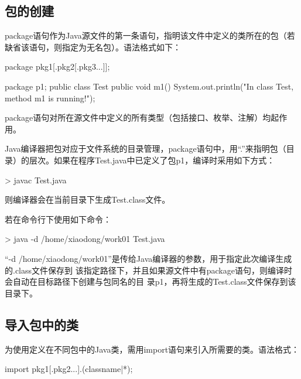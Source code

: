 \subsection{包的创建}

package语句作为Java源文件的第一条语句，指明该文件中定义的类所在的包（若缺省该语句，则指定为无名包）。语法格式如下：

\begin{javaCode}
  package pkg1[.pkg2[.pkg3...]];
\end{javaCode}


\begin{javaCode}
  package p1;
  public class Test {
    public void m1() {
      System.out.println("In class Test, method m1 is running!");
    }
  }
\end{javaCode}

package语句对所在源文件中定义的所有类型（包括接口、枚举、注解）均起作用。

Java编译器把包对应于文件系统的目录管理，package语句中，用“.”来指明包（目录）的层次。如果在程序Test.java中已定义了包p1，编译时采用如下方式：

\begin{shCode}
  > javac Test.java
\end{shCode}

则编译器会在当前目录下生成Test.class文件。

若在命令行下使用如下命令：

\begin{shCode}
  > java -d /home/xiaodong/work01 Test.java
\end{shCode}

“-d /home/xiaodong/work01”是传给Java编译器的参数，用于指定此次编译生成的.class文件保存到
该指定路径下，并且如果源文件中有package语句，则编译时会自动在目标路径下创建与包同名的目
录p1，再将生成的Test.class文件保存到该目录下。

\subsection{导入包中的类}

为使用定义在不同包中的Java类，需用import语句来引入所需要的类。语法格式：

\begin{javaCode}
  import pkg1[.pkg2...].(classname|*);  
\end{javaCode}


